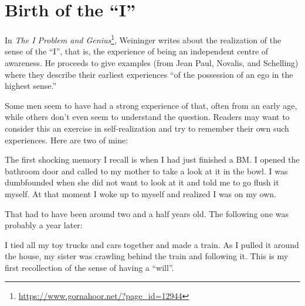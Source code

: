 \section{Birth of the “I”}

In \emph{The I Problem and Genius}\footnote{\url{https://www.gornahoor.net/?page_id=12944}}, Weininger writes about the realization of the sense of the “I”, that is, the experience of being an independent centre of awareness. He proceeds to give examples (from Jean Paul, Novalis, and Schelling) where they describe their earliest experiences “of the possession of an ego in the highest sense.”

Some men seem to have had a strong experience of that, often from an early age, while others don't even seem to understand the question. Readers may want to consider this an exercise in self-realization and try to remember their own such experiences. Here are two of mine:

\begin{quotex}
The first shocking memory I recall is when I had just finished a BM. I opened the bathroom door and called to my mother to take a look at it in the bowl. I was dumbfounded when she did not want to look at it and told me to go flush it myself. At that moment I woke up to myself and realized I was on my own.

\end{quotex}
That had to have been around two and a half years old. The following one was probably a year later:

\begin{quotex}
I tied all my toy trucks and cars together and made a train. As I pulled it around the house, my sister was crawling behind the train and following it. This is my first recollection of the sense of having a “will”.

\end{quotex}


